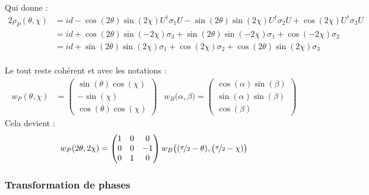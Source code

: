\\
Qui donne :
\begin{align*}
	2\rho_P(\theta, \chi) &= id - \cos(2\theta) \sin(2\chi) U^\dagger \sigma_1 U - \sin(2\theta) \sin(2\chi) U^\dagger \sigma_2 U + \cos (2\chi) U^\dagger \sigma_3 U \\
	&= id + \cos(2\theta) \sin(-2\chi) \sigma_3 + \sin(2\theta) \sin(-2\chi)  \sigma_1 + \cos (-2\chi) \sigma_2 \\
	&= id + \sin(2\theta) \sin(2\chi)  \sigma_1 + \cos (2\chi) \sigma_2 + \cos(2\theta) \sin(2\chi) \sigma_3
\end{align*}
\\ 
Le tout reste cohérent et avec les notations :
\begin{align*}
	w_P(\theta, \chi) &= \begin{pmatrix}
		\sin(\theta) \cos(\chi) \\ -\sin (\chi) \\ \cos(\theta) \cos(\chi)
	\end{pmatrix}  &   w_B\big( \alpha, \beta \big) = \begin{pmatrix}
		\cos(\alpha) \sin(\beta) \\ \sin(\alpha) \sin(\beta) \\ \cos (\beta)
	\end{pmatrix}
\end{align*}
Cela devient :
\[w_P(2\theta, 2\chi) = \begin{pmatrix}
	1 & 0 & 0 \\ 0 & 0 & -1 \\ 0 & 1 & 0
\end{pmatrix} w_B\big( (\nicefrac{\pi}{2}-\theta ), \big(\nicefrac{\pi}{2}-\chi) \big)\]
\skipl 



\subsubsection{Transformation de phases}

